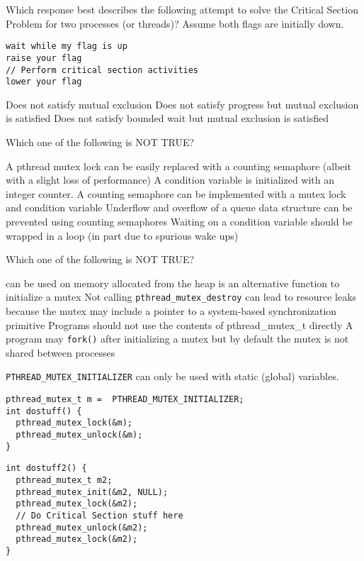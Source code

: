\variant
Which response best describes the following attempt to solve the Critical Section Problem for two processes (or threads)? Assume both flags are initially down.
\begin{verbatim}
wait while my flag is up
raise your flag
// Perform critical section activities
lower your flag
\end{verbatim}
\begin{answers}
\correctanswer Does not satisfy mutual exclusion
\answer Does not satisfy progress but mutual exclusion is satisfied
\answer Does not satisfy bounded wait but mutual exclusion is satisfied
\end{answers}
\begin{solution}
\end{solution}


\variant
Which one of the following is NOT TRUE?
\begin{answers}
\answer A pthread mutex lock can be easily replaced with a counting semaphore (albeit with a slight loss of performance)
\correctanswer A condition variable is initialized with an integer counter.
\answer A counting semaphore can be implemented with a mutex lock and condition variable
\answer Underflow and overflow of a queue data structure can be prevented using counting semaphores
\answer Waiting on a condition variable should be wrapped in a loop (in part due to spurious wake ups)
\end{answers}
\begin{solution}
\end{solution}


\variant
Which one of the following is NOT TRUE?
\begin{answers}
 can be used on memory allocated from the heap
 is an alternative function to initialize a mutex
\answer Not calling {\tt pthread_mutex_destroy} can lead to resource leaks because the mutex may include a pointer to a system-based synchronization primitive
\answer Programs should not use the contents of pthread_mutex_t directly
\answer A program may {\tt fork()} after initializing a mutex but by default the mutex is not shared between processes 
\end{answers}
\begin{solution}
{\tt  PTHREAD_MUTEX_INITIALIZER} can only be used with static (global) variables.
\begin{verbatim}
pthread_mutex_t m =  PTHREAD_MUTEX_INITIALIZER;
int dostuff() {
  pthread_mutex_lock(&m);
  pthread_mutex_unlock(&m);
}
\end{verbatim}
\begin{verbatim}
int dostuff2() {
  pthread_mutex_t m2;
  pthread_mutex_init(&m2, NULL);
  pthread_mutex_lock(&m2);
  // Do Critical Section stuff here
  pthread_mutex_unlock(&m2);
  pthread_mutex_lock(&m2);
}
\end{verbatim}
\end{solution}



